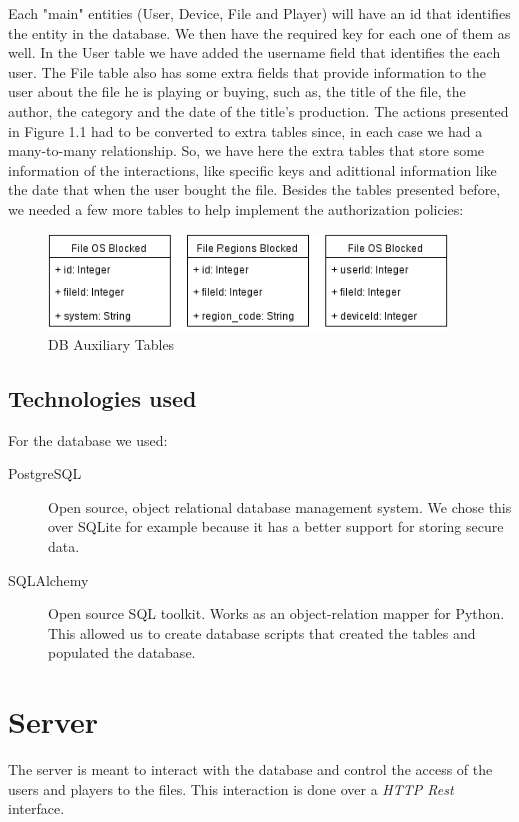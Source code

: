 \documentclass[11pt,a4paper]{report}
\begin{document}
Each "main" entities (User, Device, File and Player) will have an id that identifies the entity in the database.
We then have the required key for each one of them as well.
\newline In the User table we have added the username field that identifies the each user.
\newline The File table also has some extra fields that provide information to the user about the file he is playing or buying, such as, the title of the file, the author, the category and the date of the title's production.
\newline The actions presented in Figure 1.1 had to be converted to extra tables since, in each case we had a many-to-many relationship. So, we have here the extra tables that store some information of the interactions, like specific keys and adittional information like the date that when the user bought the file. 
\newline Besides the tables presented before, we needed a few more tables to help implement the authorization policies:

\begin{figure}[H]
\centerline{\includegraphics[width=300pt]{images/auxTables.png}}
\caption{DB Auxiliary Tables}
\label{tables}
\end{figure}


\subsection{Technologies used}
For the database we used:
\begin{description}
  \item[PostgreSQL] Open source, object relational database management system. We chose this over SQLite for example because it has a better support for storing secure data.
  \item[SQLAlchemy] Open source SQL toolkit. Works as an object-relation mapper for Python. This allowed us to create database scripts that created the tables and populated the database.
\end{description}

\section{Server}
The server is meant to interact with the database and control the access of the users and players to the files.
This interaction is done over a \emph{HTTP Rest} interface.
 
\end{document}

